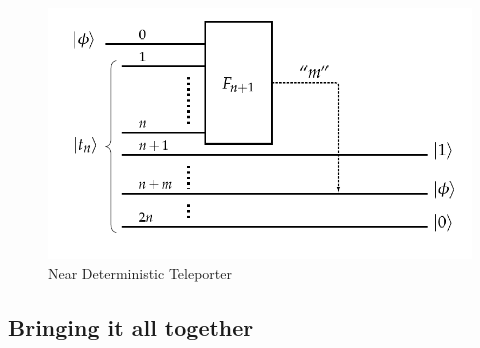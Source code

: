 \begin{figure}
    \centering
    \includegraphics[scale=0.5]{images/Near Deterministic Teleporter.png}
    \caption{Near Deterministic Teleporter}
    \label{fig:Near deterministic tele}
\end{figure}

\subsection{Bringing it all together}
